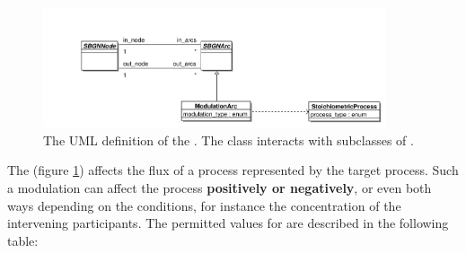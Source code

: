 





\label{defn:ModulationArc}

\begin{figure}[htb]
  \centering
  \includegraphics[width = 0.9\textwidth]{images/modulationarcuml}
  \caption{The UML definition of the . The class interacts with
    subclasses of .}
  \label{fig:techref:modulationarcuml}
\end{figure}

The  (figure \ref{fig:techref:modulationarcuml})
affects the flux of a process represented by the target process. Such
a modulation can affect the process \textbf{positively or negatively},
or even both ways depending on the conditions, for instance the
concentration of the intervening participants. The permitted values
for  are described in the following table:

